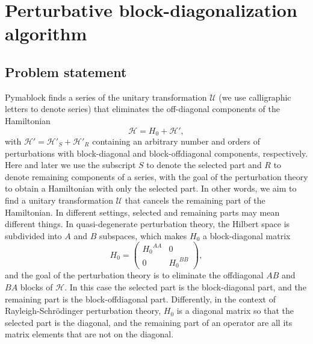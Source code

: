 \section{Perturbative block-diagonalization algorithm}
\label{sec:algorithm}

\subsection{Problem statement}

Pymablock finds a series of the unitary transformation $\mathcal{U}$ (we use calligraphic letters to denote series) that eliminates the off-diagonal components of the Hamiltonian
%
\begin{equation}
\label{eq:hamiltonian}
\mathcal{H} = H_0 + \mathcal{H}',
\end{equation}
%
with $\mathcal{H}' = \mathcal{H}'_{S} + \mathcal{H}'_{R}$ containing an arbitrary number and orders of perturbations with block-diagonal and block-offdiagonal components, respectively.
Here and later we use the subscript $S$ to denote the selected part and $R$ to denote remaining components of a series, with the goal of the perturbation theory to obtain a Hamiltonian with only the selected part.
In other words, we aim to find a unitary transformation $\mathcal{U}$ that cancels the remaining part of the Hamiltonian.
In different settings, selected and remaining parts may mean different things.
In quasi-degenerate perturbation theory, the Hilbert space is subdivided into $A$ and $B$ subspaces, which makes $H_0$ a block-diagonal matrix
\begin{equation}
  H_0 = \begin{pmatrix}
    {H_0}^{AA} & 0 \\
    0 & {H_0}^{BB}
    \end{pmatrix},
\end{equation}
and the goal of the perturbation theory is to eliminate the offdiagonal $AB$ and $BA$ blocks of $\mathcal{H}$.
In this case the selected part is the block-diagonal part, and the remaining part is the block-offdiagonal part.
Differently, in the context of Rayleigh-Schr\"odinger perturbation theory, $H_0$ is a diagonal matrix so that the selected part is the diagonal, and the remaining part of an operator are all its matrix elements that are not on the diagonal.


